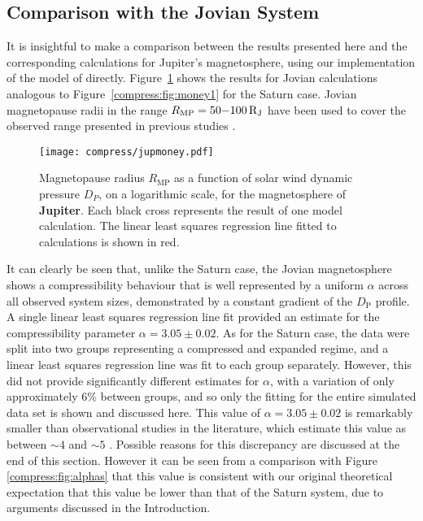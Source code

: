 \subsection{Comparison with the Jovian System}\label{compress:sec:jup}
It is insightful to make a comparison between the results presented here and the corresponding calculations for Jupiter's magnetosphere, using our implementation of the model of \citet{caudal1986} directly. Figure~\ref{compress:fig:jupmoney} shows the results for Jovian calculations analogous to Figure~\ref{compress:fig:money1} for the Saturn case. Jovian magnetopause radii in the range $R_\mathrm{MP} = 50{\--}\SI{100}{R_J}$ have been used to cover the observed range presented in previous studies \citep{joy2002}.
\begin{figure}
\centering
\noindent\texttt{[image: compress/jupmoney.pdf]}
\caption[Magnetopause radius versus solar wind dynamic pressure profile for Jupiter's magnetosphere.]{Magnetopause radius $R_\mathrm{MP}$ as a function of solar wind dynamic pressure $D_{P}$, on a logarithmic scale, for the magnetosphere of \textbf{Jupiter}. Each black cross represents the result of one model calculation. The linear least squares regression line fitted to calculations is shown in red.}
\label{compress:fig:jupmoney}
\end{figure}

It can clearly be seen that, unlike the Saturn case, the Jovian magnetosphere shows a compressibility behaviour that is well represented by a uniform $\alpha$ across all observed system sizes, demonstrated by a constant gradient of the $D_\mathrm{P}$ profile. A single linear least squares regression line fit provided an estimate for the compressibility parameter $\alpha=3.05 \pm 0.02$. As for the Saturn case, the data were split into two groups representing a compressed and expanded regime, and a linear least squares regression line was fit to each group separately. However, this did not provide significantly different estimates for $\alpha$, with a variation of only approximately 6$\%$ between groups, and so only the fitting for the entire simulated data set is shown and discussed here. This value of $\alpha=3.05 \pm 0.02$ is remarkably smaller than observational studies in the literature, which estimate this value as between ${\sim}4$ and ${\sim}5$ \citep{huddleston1998,joy2002,alexeev2005}. Possible reasons for this discrepancy are discussed at the end of this section. However it can be seen from a comparison with Figure \ref{compress:fig:alphas} that this value is consistent with our original theoretical expectation that this value be lower than that of the Saturn system, due to arguments discussed in the Introduction.

